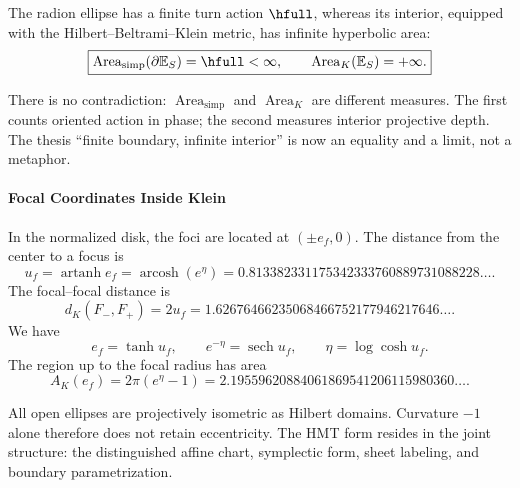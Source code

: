 \begin{theorem}
The radion ellipse has a finite turn action \(\hfull\), whereas
its interior, equipped with the Hilbert--Beltrami--Klein metric, has infinite
hyperbolic area:
\begin{equation}
\boxed{
\operatorname{Area}_{\mathrm{simp}}(\partial\mathbb E_S)=\hfull<\infty,
\qquad
\operatorname{Area}_{K}(\mathbb E_S)=+\infty.}
\label{eq:finite-infinite}
\end{equation}
\end{theorem}

There is no contradiction: \(\operatorname{Area}_{\mathrm{simp}}\) and
\(\operatorname{Area}_K\) are different measures. The first counts oriented action
in phase; the second measures interior projective depth. The thesis
\enquote{finite boundary, infinite interior} is now an equality and a limit,
not a metaphor.

\paragraph{Focal Coordinates Inside Klein}

In the normalized disk, the foci are located at \((\pm e_f,0)\). The distance from the center to a focus is
\begin{equation}
u_f=\operatorname{artanh}e_f
=\operatorname{arcosh}(e^\eta)
=0.813382331175342333760889731088228\ldots.
\label{eq:klein-focal}
\end{equation}
The focal--focal distance is
\[
d_K(F_-,F_+)=2u_f
=1.62676466235068466752177946217646\ldots.
\]
We have
\begin{equation}
e_f=\tanh u_f,\qquad
e^{-\eta}=\operatorname{sech}u_f,\qquad
\eta=\log\cosh u_f.
\label{eq:focal-hyperbolic-chain}
\end{equation}
The region up to the focal radius has area
\[
A_K(e_f)=2\pi(e^\eta-1)
=2.19559620884061869541206115980360\ldots.
\]

All open ellipses are projectively isometric as Hilbert domains. Curvature
\(-1\) alone therefore does not retain eccentricity. The HMT form
resides in the joint structure: the distinguished affine chart, symplectic
form, sheet labeling, and boundary parametrization.
